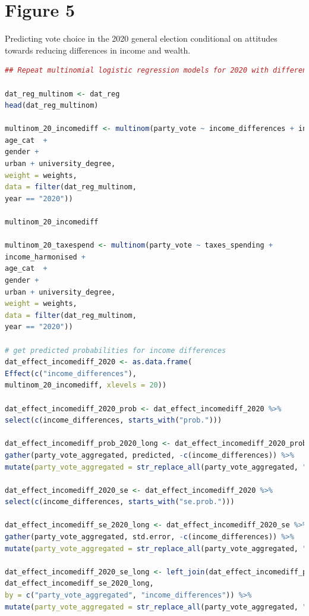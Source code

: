 \documentclass[12pt,letterpaper]{article}
\begin{document}
\newpage
\section*{Figure 5} 
\vspace{.25cm}

Predicting vote choice in the 2020 general election conditional on attitudes
towards reducing differences in income and wealth.

\begin{lstlisting}[language=R]
## Repeat multinomial logistic regression models for 2020 with different set of independent variables

dat_reg_multinom <- dat_reg
head(dat_reg_multinom)

multinom_20_incomediff <- multinom(party_vote ~ income_differences + income_harmonised + 
age_cat  + 
gender + 
urban + university_degree,
weight = weights,
data = filter(dat_reg_multinom, 
year == "2020"))

multinom_20_incomediff

multinom_20_taxespend <- multinom(party_vote ~ taxes_spending + 
income_harmonised +
age_cat  + 
gender +  
urban + university_degree,
weight = weights,
data = filter(dat_reg_multinom, 
year == "2020"))

# get predicted probabilities for income differences
dat_effect_incomediff_2020 <- as.data.frame(
Effect(c("income_differences"), 
multinom_20_incomediff, xlevels = 20))

dat_effect_incomediff_2020_prob <- dat_effect_incomediff_2020 %>% 
select(c(income_differences, starts_with("prob.")))

dat_effect_incomediff_prob_2020_long <- dat_effect_incomediff_2020_prob %>% 
gather(party_vote_aggregated, predicted, -c(income_differences)) %>% 
mutate(party_vote_aggregated = str_replace_all(party_vote_aggregated, "prob.", ""))

dat_effect_incomediff_2020_se <- dat_effect_incomediff_2020 %>% 
select(c(income_differences, starts_with("se.prob.")))

dat_effect_incomediff_se_2020_long <- dat_effect_incomediff_2020_se %>% 
gather(party_vote_aggregated, std.error, -c(income_differences)) %>% 
mutate(party_vote_aggregated = str_replace_all(party_vote_aggregated, "se.prob.", ""))

dat_effect_incomediff_2020_se_long <- left_join(dat_effect_incomediff_prob_2020_long,
dat_effect_incomediff_se_2020_long,
by = c("party_vote_aggregated", "income_differences")) %>% 
mutate(party_vote_aggregated = str_replace_all(party_vote_aggregated, "\\.", " ")) 


\end{lstlisting}
\end{document}
